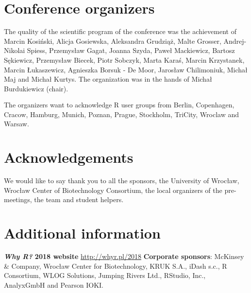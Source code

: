 \section{Conference organizers}

The quality of the scientific program of the conference was the achievement of Marcin Kosi\'{n}ski, Alicja Gosiewska, Aleksandra Grudzi\k{a}\.{z}, Malte Grosser, Andrej-Nikolai Spiess, Przemys\l{}aw Gagat, Joanna Szyda, Pawe\l{} Mackiewicz, Bartosz S\k{e}kiewicz, Przemys\l{}aw Biecek, Piotr Sobczyk, Marta Kara\'{s}, Marcin Krzystanek, Marcin \L{}ukaszewicz, Agnieszka Borsuk - De Moor, Jaros\l{}aw Chilimoniuk, Micha\l{} Maj and Micha\l{} Kurtys. The organization was in the hands of Micha\l{} Burdukiewicz (chair).

The organizers want to acknowledge R user groups from Berlin, Copenhagen, Cracow, Hamburg, Munich, Poznan, Prague, Stockholm, TriCity, Wroclaw and Warsaw. 

\section{Acknowledgements}

We would like to say thank you to all the sponsors, the University of Wroc\l{}aw, Wroc\l{}aw Center of Biotechnology Consortium, the local organizers of the pre-meetings, the  team and student helpers.

\section{Additional information}

\textbf{\emph{Why R?} 2018 website} \url{http://whyr.pl/2018}
\newline
\textbf{Corporate sponsors}: McKinsey \& Company, Wroc\l{}aw Center for Biotechnology, KRUK S.A., iDash s.c., R Consortium, WLOG Solutions, Jumping Rivers Ltd., RStudio, Inc., Analyx\textregistered GmbH and Pearson IOKI.





\address{Micha\l{} Burdukiewicz\\
  Warsaw University of Technology, Why R? Foundation\\
  Pl. Politechniki 1, 00-661 Warsaw\\
  Poland\\}

\address{Marta Karas\\
  Johns Hopkins Bloomberg School of Public Health\\
  615 N Wolfe St Rm E3527\\
  Baltimore, MD \\ 
  USA\\}

